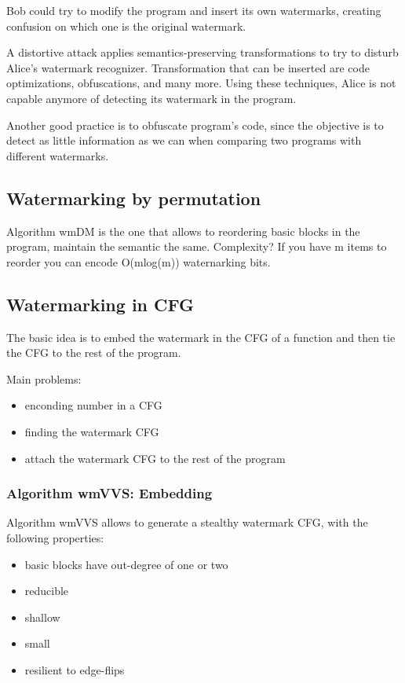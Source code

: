 Bob could try to modify the program and insert its own watermarks, creating confusion on which one is the original watermark. \newline

A distortive attack applies semantics-preserving transformations to try to disturb Alice's watermark recognizer. Transformation that can be inserted are code optimizations, obfuscations, and many more. Using these techniques, Alice is not capable anymore of detecting its watermark in the program.

Another good practice is to obfuscate program's code, since the objective is to detect as little information as we can when comparing two programs with different watermarks. 

\subsection{Watermarking by permutation}

Algorithm wmDM is the one that allows to reordering basic blocks in the program, maintain the semantic the same. \newline
Complexity? If you have m items to reorder you can encode O(mlog(m)) waternarking bits.

\subsection{Watermarking in CFG}

The basic idea is to embed the watermark in the CFG of a function and then tie the CFG to the rest of the program. \newline 

Main problems: 
\begin{itemize}
    \item enconding number in a CFG
    \item finding the watermark CFG
    \item attach the watermark CFG to the rest of the program 
\end{itemize}

\subsubsection{Algorithm wmVVS: Embedding}

Algorithm wmVVS allows to generate a stealthy watermark CFG, with the following properties: 

\begin{itemize}
    \item basic blocks have out-degree of one or two
    \item reducible 
    \item shallow
    \item small
    \item resilient to edge-flips
\end{itemize}

